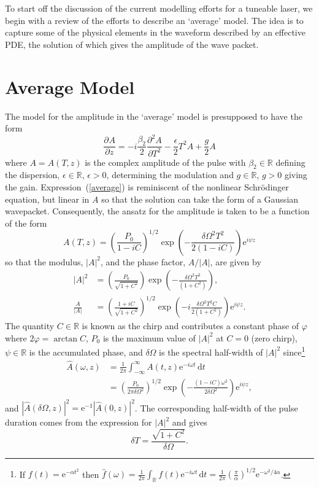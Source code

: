 \documentclass[%
 aps,
 jmp,%
 amsmath,amssymb,
 reprint,%
nofootinbib
]{revtex4-1}
\providecommand{\df}{\textrm{d}}
\newcommand{\pdiff}[3][]{\frac{\partial^{#1}#2}{\partial{#3}^{#1}}}
\begin{document}
To start off the discussion of the current modelling efforts for a tuneable laser, we begin with a review of the efforts to describe an `average' model. The idea is to capture some of the physical elements in the waveform described by an effective PDE, the solution of which gives the amplitude of the wave packet. 

\section{Average Model}
The model for the amplitude in the `average' model is presupposed to have the form
\begin{equation}
\label{average}
	\pdiff{A}{z} = -i\frac{\beta_2}{2}\pdiff[2]{A}{T} - \frac{\epsilon}{2}T^2 A + \frac{g}{2}A
\end{equation}
where $A=A(T,z)$ is the complex amplitude of the pulse with $\beta_2 \in \mathbb{R}$ defining the dispersion, $\epsilon \in \mathbb{R}$, $\epsilon > 0$, determining the modulation and $g \in \mathbb{R}$, $g > 0$ giving the gain. Expression~(\ref{average}) is reminiscent of the nonlinear Schr\"odinger equation, but linear in $A$ so that the solution can take the form of a Gaussian wavepacket. Consequently, the ansatz for the amplitude is taken to be a function of the form
\begin{equation}
\label{ansatz}
	A(T,z) = \left(\frac{P_0}{1-i C}\right)^{1/2}\exp
	\left(-\frac{\delta \Omega^2 T^2}{2(1-i C)}\right)\textrm{e}^{i\psi z}
\end{equation}
so that the modulus, $|A|^2$, and the phase factor, $A/|A|$, are given by
\begin{align*}
	\left|A\right|^2 &= \left(\frac{P_0}{\sqrt{1 + C^2}}\right)
	\exp\left(-\frac{\delta \Omega^2 T^2}{(1 + C^2)}\right), \\
	\frac{A}{|A|} &= \left(\frac{1+iC}{\sqrt{1+C^2}}\right)^{1/2}\exp
	\left(-i\frac{\delta \Omega^2 T^2 C}{2(1+C^2)}\right)\textrm{e}^{i\psi z}.
\end{align*}
The quantity $C \in \mathbb{R}$ is known as the chirp and contributes a constant phase of $\varphi$ where $2\varphi = \arctan C$, $P_0$ is the maximum value of $|A|^2$ at $C=0$ (zero chirp), $\psi \in \mathbb{R}$ is the accumulated phase, and $\delta\Omega$ is the spectral half-width of $|A|^2$ since\footnote{If $f(t) = \textrm{e}^{-\alpha t^2}$ then $\hat{f}(\omega) = \frac{1}{2\pi}\int_{\mathbb{R}} f(t)\textrm{e}^{-i\omega t}\, \df t = \frac{1}{2\pi} (\frac{\pi}{\alpha})^{1/2}\textrm{e}^{-\omega^2/4\alpha}$.}
\begin{align*}
	\hat{A}(\omega,z) &= \frac{1}{2\pi}\int_{-\infty}^\infty A(t,z) \textrm{e}^{-i\omega t}\, \df t \\
	&= \left(\frac{P_0}{2\pi\delta \Omega^2}\right)^{1/2}
	\exp\left(-\frac{(1-i C)\omega^2}{2\delta \Omega^2}\right) \textrm{e}^{i\psi z},
\end{align*}
and $|\hat{A}(\delta\Omega,z)|^2 = \textrm{e}^{-1}|\hat{A}(0,z)|^2$. The corresponding half-width of the pulse duration comes from the expression for $|A|^2$ and gives
\begin{equation}
\label{duration}
	\delta T = \frac{\sqrt{1+C^2}}{\delta \Omega}.
\end{equation}
\end{document}
